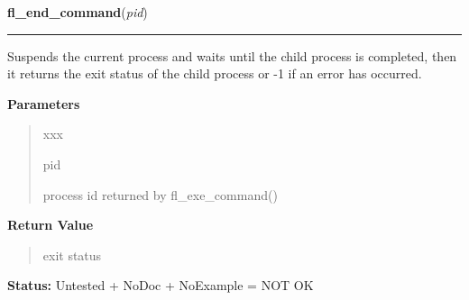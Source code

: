 \hspace{.8\funcindent}\begin{boxedminipage}{\funcwidth}

    \raggedright \textbf{fl\_end\_command}(\textit{pid})

    \vspace{-1.5ex}

    \rule{\textwidth}{0.5\fboxrule}
\setlength{\parskip}{2ex}
    Suspends the current process and waits until the child process is 
    completed, then it returns the exit status of the child process or -1 
    if an error has occurred.

\setlength{\parskip}{1ex}
      \textbf{Parameters}
      \vspace{-1ex}

      \begin{quote}
        \begin{Ventry}{xxx}

          \item[pid]

          process id returned by fl\_exe\_command()

        \end{Ventry}

      \end{quote}

      \textbf{Return Value}
    \vspace{-1ex}

      \begin{quote}
      exit status

      \end{quote}

\textbf{Status:} Untested + NoDoc + NoExample = NOT OK



    \end{boxedminipage}

    \label{xformslib:library:fl_check_command}

    \vspace{0.5ex}

